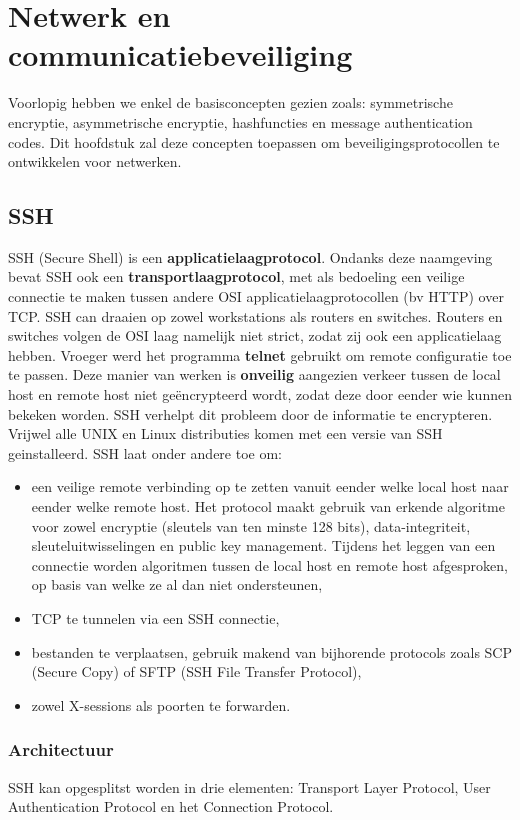 \documentclass{report}
\begin{document}
	\chapter{Netwerk en communicatiebeveiliging}
	Voorlopig hebben we enkel de basisconcepten gezien zoals: symmetrische encryptie, asymmetrische encryptie, hashfuncties en message authentication codes. Dit hoofdstuk zal deze concepten toepassen om beveiligingsprotocollen te ontwikkelen voor netwerken.
	\section{SSH}
	SSH (Secure Shell) is een \textbf{applicatielaagprotocol}. Ondanks deze naamgeving bevat SSH ook een \textbf{transportlaagprotocol}, met als bedoeling een veilige connectie te maken tussen andere OSI applicatielaagprotocollen (bv HTTP) over TCP. SSH can draaien op zowel workstations als routers en switches. Routers en switches volgen de OSI laag namelijk niet strict, zodat zij ook een applicatielaag hebben. Vroeger werd het programma \textbf{telnet} gebruikt om remote configuratie toe te passen. Deze manier van werken is \textbf{onveilig} aangezien verkeer tussen de local host en remote host niet geëncrypteerd wordt, zodat deze door eender wie kunnen bekeken worden. SSH verhelpt dit probleem door de informatie te encrypteren. Vrijwel alle UNIX en Linux distributies komen met een versie van SSH geinstalleerd. SSH laat onder andere toe om:
	\begin{itemize}
		\item een veilige remote verbinding op te zetten vanuit eender welke local host naar eender welke remote host. Het protocol maakt gebruik van erkende algoritme voor zowel encryptie (sleutels van ten minste 128 bits), data-integriteit, sleuteluitwisselingen en public key management. Tijdens het leggen van een connectie worden algoritmen tussen de local host en remote host afgesproken, op basis van welke ze al dan niet ondersteunen,
		\item TCP te tunnelen via een SSH connectie,
		\item bestanden te verplaatsen, gebruik makend van bijhorende protocols zoals SCP (Secure Copy) of SFTP (SSH File Transfer Protocol),
		\item zowel X-sessions als poorten te forwarden.
	\end{itemize}
	\subsection{Architectuur}
	SSH kan opgesplitst worden in drie elementen: Transport Layer Protocol, User Authentication Protocol en het Connection Protocol.
\end{document}
